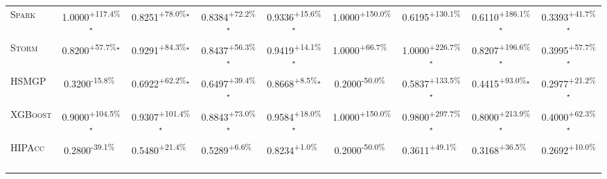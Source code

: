 \begin{table}[htbp]
\begin{tabular}{l|cccc|cccc}
\textsc{Spark} & \cellcolor{green!30}1.0000\textsuperscript{+117.4\%}$^\star$ & \cellcolor{green!30}0.8251\textsuperscript{+78.0\%}$^\star$ & \cellcolor{green!30}0.8384\textsuperscript{+72.2\%}$^\star$ & \cellcolor{green!30}0.9336\textsuperscript{+15.6\%}$^\star$ & \cellcolor{green!30}1.0000\textsuperscript{+150.0\%}$^{\,\,\,}$ & \cellcolor{green!30}0.6195\textsuperscript{+130.1\%}$^{\,\,\,}$ & \cellcolor{green!30}0.6110\textsuperscript{+186.1\%}$^\star$ & \cellcolor{green!30}0.3393\textsuperscript{+41.7\%}$^\star$ \\
\textsc{Storm} & \cellcolor{green!30}0.8200\textsuperscript{+57.7\%}$^\star$ & \cellcolor{green!30}0.9291\textsuperscript{+84.3\%}$^\star$ & \cellcolor{green!30}0.8437\textsuperscript{+56.3\%}$^\star$ & \cellcolor{green!30}0.9419\textsuperscript{+14.1\%}$^\star$ & \cellcolor{green!30}1.0000\textsuperscript{+66.7\%}$^{\,\,\,}$ & \cellcolor{green!30}1.0000\textsuperscript{+226.7\%}$^\star$ & \cellcolor{green!30}0.8207\textsuperscript{+196.6\%}$^\star$ & \cellcolor{green!30}0.3995\textsuperscript{+57.7\%}$^\star$ \\
\textsc{HSMGP} & \cellcolor{red!30}0.3200\textsuperscript{-15.8\%}$^{\,\,\,}$ & \cellcolor{green!30}0.6922\textsuperscript{+62.2\%}$^\star$ & \cellcolor{green!30}0.6497\textsuperscript{+39.4\%}$^\star$ & \cellcolor{green!30}0.8668\textsuperscript{+8.5\%}$^\star$ & \cellcolor{red!30}0.2000\textsuperscript{-50.0\%}$^{\,\,\,}$ & \cellcolor{green!30}0.5837\textsuperscript{+133.5\%}$^\star$ & \cellcolor{green!30}0.4415\textsuperscript{+93.0\%}$^\star$ & \cellcolor{green!30}0.2977\textsuperscript{+21.2\%}$^\star$ \\
\textsc{XGBoost} & \cellcolor{green!30}0.9000\textsuperscript{+104.5\%}$^\star$ & \cellcolor{green!30}0.9307\textsuperscript{+101.4\%}$^\star$ & \cellcolor{green!30}0.8843\textsuperscript{+73.0\%}$^\star$ & \cellcolor{green!30}0.9584\textsuperscript{+18.0\%}$^\star$ & \cellcolor{green!30}1.0000\textsuperscript{+150.0\%}$^{\,\,\,}$ & \cellcolor{green!30}0.9800\textsuperscript{+297.7\%}$^\star$ & \cellcolor{green!30}0.8000\textsuperscript{+213.9\%}$^\star$ & \cellcolor{green!30}0.4000\textsuperscript{+62.3\%}$^\star$ \\
\textsc{HIPAcc} & \cellcolor{red!30}0.2800\textsuperscript{-39.1\%}$^{\,\,\,}$ & \cellcolor{green!30}0.5480\textsuperscript{+21.4\%}$^{\,\,\,}$ & \cellcolor{green!30}0.5289\textsuperscript{+6.6\%}$^{\,\,\,}$ & \cellcolor{green!30}0.8234\textsuperscript{+1.0\%}$^{\,\,\,}$ & \cellcolor{red!30}0.2000\textsuperscript{-50.0\%}$^{\,\,\,}$ & \cellcolor{green!30}0.3611\textsuperscript{+49.1\%}$^{\,\,\,}$ & \cellcolor{green!30}0.3168\textsuperscript{+36.5\%}$^{\,\,\,}$ & \cellcolor{green!30}0.2692\textsuperscript{+10.0\%}$^{\,\,\,}$ \\

\end{tabular}
\end{table}
